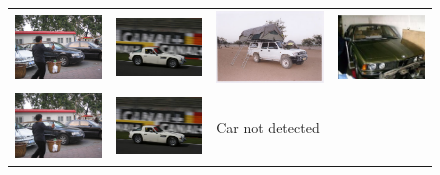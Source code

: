 \documentclass[10pt,twocolumn,letterpaper]{article}
\begin{document}
\begin{figure}[p]
\centering
\begin{tabular}{ p{4cm} p{4cm} p{4cm} p{4cm} }
\includegraphics[width=3.95cm]{figures/results/2008_002483.jpg.eps} &
\includegraphics[width=3.95cm]{figures/results/2008_007466.jpg.eps} &
\includegraphics[width=3.95cm]{figures/results/2008_005378.jpg.eps} &
\includegraphics[width=3.95cm]{figures/results/2008_007529.jpg.eps} \\
\includegraphics[width=3.95cm]{figures/results/a2008_002483.jpg.eps} &
\includegraphics[width=3.95cm]{figures/results/a2008_007466.jpg.eps} &
Car not detected &

\end{tabular}
\end{figure}
\end{document}

